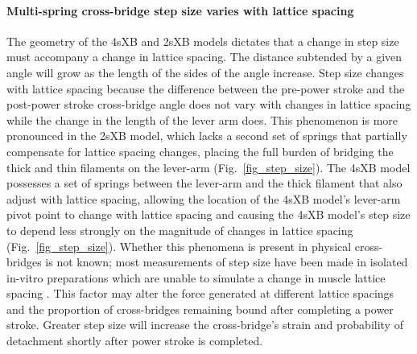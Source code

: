 \documentclass[11pt,titlepage]{article}
\begin{document}
\paragraph{Multi-spring cross-bridge step size varies with lattice spacing} %
The geometry of the 4sXB and 2sXB models dictates that a change in step size must accompany a change in lattice spacing. 
The distance subtended by a given angle will grow as the length of the sides of the angle increase. 
Step size changes with lattice spacing because the difference between the pre-power stroke and the post-power stroke cross-bridge angle does not vary with changes in lattice spacing while the change in the length of the lever arm does. 
This phenomenon is more pronounced in the 2sXB model, which lacks a second set of springs that partially compensate for lattice spacing changes, placing the full burden of bridging the thick and thin filaments on the lever-arm (Fig.~\ref{fig_step_size}). 
The 4sXB model possesses a set of springs between the lever-arm and the thick filament that also adjust with lattice spacing, allowing the location of the 4sXB model's lever-arm pivot point to change with lattice spacing and causing the 4sXB model's step size to depend less strongly on the magnitude of changes in lattice spacing (Fig.~\ref{fig_step_size}).  
Whether this phenomena is present in physical cross-bridges is not known; most measurements of step size have been made in isolated in-vitro preparations which are unable to simulate a change in muscle lattice spacing \citep{HowardBook, Peterman2004}.  
This factor may alter the force generated at different lattice spacings and the proportion of cross-bridges remaining bound after completing a power stroke.
Greater step size will increase the cross-bridge's strain and probability of detachment shortly after power stroke is completed. 
\end{document}
